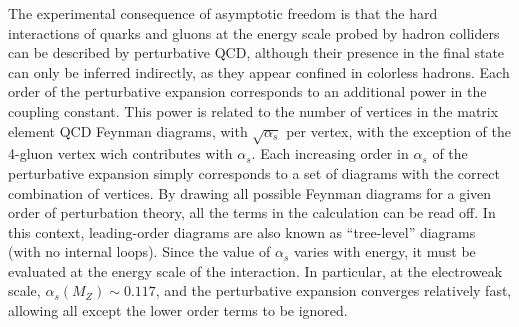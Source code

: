The experimental consequence of asymptotic freedom is that the hard interactions of quarks and gluons at the energy scale probed by hadron colliders can be described by perturbative QCD, although their presence in the final state can only be inferred indirectly, as they appear confined in colorless hadrons.
Each order of the perturbative expansion corresponds to an additional power in the coupling constant. This power is related to the number of vertices in the matrix element QCD Feynman diagrams, %
with $\sqrt{\alpha_s}$ per vertex, with the exception of the 4-gluon vertex wich contributes with $\alpha_s$. Each increasing order in $\alpha_s$ of the perturbative expansion simply corresponds to a set of diagrams with the correct combination of vertices.  By drawing all possible Feynman diagrams for a given order of perturbation theory, all the terms in the calculation can be read off. In this context, leading-order diagrams are also known as ``tree-level'' diagrams (with no internal loops). 
 Since the value of $\alpha_s$ varies with energy, it must be evaluated at the energy scale of the interaction. In particular, at the electroweak scale, $\alpha_s(M_Z)\sim 0.117$, and the perturbative expansion converges relatively fast, allowing all except the lower order terms to be ignored.
%
